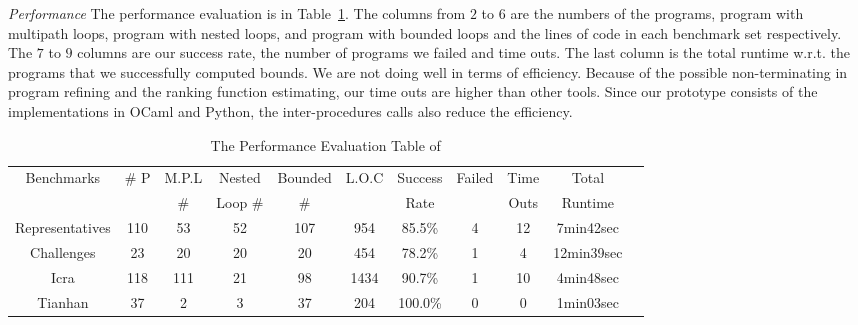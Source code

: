 %
\emph{Performance}
The performance evaluation is in Table~\ref{tb:performance-eval}.
The columns from $2$ to $6$ are the numbers of the programs, program with multipath loops, program with nested loops, and program with bounded loops and the lines of code in each benchmark set respectively.
The $7$ to $9$ columns are our success rate, the number of programs we failed and time outs. The last column is the total runtime w.r.t. the programs that we successfully computed bounds.
We are not doing well in terms of efficiency. Because of the possible non-terminating in program refining and the ranking function estimating, our time outs are higher than other tools.
Since our prototype consists of the implementations in OCaml and Python, the inter-procedures calls also reduce the efficiency.
%
%
\begin{table}[H]
\caption{The Performance Evaluation Table of {\PSRB}}
\label{tb:performance-eval}
    \centering
{\scriptsize
\begin{tabular}{ | c | c | c | c | c | c | c | c | c | c | c |}
\hline
\hline
\multirow{2}{*}{Benchmarks} & \multirow{2}{*}{\# P}  & {M.P.L} & Nested  & {Bounded} 
& \multirow{2}{*}{L.O.C} & {Success} & \multirow{2}{*}{Failed} & Time  & Total
\\
&  & \# & Loop \# & \# & & Rate &  & Outs &   Runtime \\
\hline
\hline 
{Representatives} & {110}  & 53  & 52  & 107 & 954 & 85.5\% & 4 & 12 & 7min42sec \\
\hline
Challenges & 23  & 20 & 20 & {20} & 454 & {78.2\%}  & 1 & 4 & {12min39sec} \\
\hline
{Icra} & 118 & 111 & 21 & 98 & 1434  & 90.7\% & 1 & 10 & {4min48sec} \\
\hline
Tianhan & 37 & 2 & 3 & 37 & 204 & 100.0\% & 0 & 0 & 1min03sec \\
\hline
\hline
\end{tabular}    
}
\end{table}
